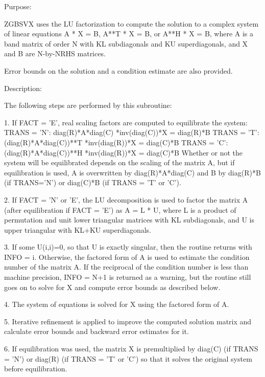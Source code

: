  \begin{DoxyParagraph}{Purpose\+: }
\begin{DoxyVerb} ZGBSVX uses the LU factorization to compute the solution to a complex
 system of linear equations A * X = B, A**T * X = B, or A**H * X = B,
 where A is a band matrix of order N with KL subdiagonals and KU
 superdiagonals, and X and B are N-by-NRHS matrices.

 Error bounds on the solution and a condition estimate are also
 provided.\end{DoxyVerb}
 
\end{DoxyParagraph}
\begin{DoxyParagraph}{Description\+: }
\begin{DoxyVerb} The following steps are performed by this subroutine:

 1. If FACT = 'E', real scaling factors are computed to equilibrate
    the system:
       TRANS = 'N':  diag(R)*A*diag(C)     *inv(diag(C))*X = diag(R)*B
       TRANS = 'T': (diag(R)*A*diag(C))**T *inv(diag(R))*X = diag(C)*B
       TRANS = 'C': (diag(R)*A*diag(C))**H *inv(diag(R))*X = diag(C)*B
    Whether or not the system will be equilibrated depends on the
    scaling of the matrix A, but if equilibration is used, A is
    overwritten by diag(R)*A*diag(C) and B by diag(R)*B (if TRANS='N')
    or diag(C)*B (if TRANS = 'T' or 'C').

 2. If FACT = 'N' or 'E', the LU decomposition is used to factor the
    matrix A (after equilibration if FACT = 'E') as
       A = L * U,
    where L is a product of permutation and unit lower triangular
    matrices with KL subdiagonals, and U is upper triangular with
    KL+KU superdiagonals.

 3. If some U(i,i)=0, so that U is exactly singular, then the routine
    returns with INFO = i. Otherwise, the factored form of A is used
    to estimate the condition number of the matrix A.  If the
    reciprocal of the condition number is less than machine precision,
    INFO = N+1 is returned as a warning, but the routine still goes on
    to solve for X and compute error bounds as described below.

 4. The system of equations is solved for X using the factored form
    of A.

 5. Iterative refinement is applied to improve the computed solution
    matrix and calculate error bounds and backward error estimates
    for it.

 6. If equilibration was used, the matrix X is premultiplied by
    diag(C) (if TRANS = 'N') or diag(R) (if TRANS = 'T' or 'C') so
    that it solves the original system before equilibration.\end{DoxyVerb}
 
\end{DoxyParagraph}

